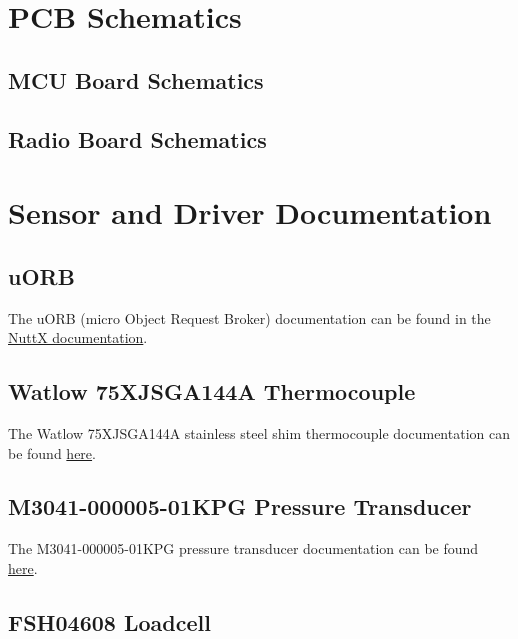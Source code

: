 \section{PCB Schematics} \label{apx:pcb-schematics}
\subsection{MCU Board Schematics}


\subsection{Radio Board Schematics}



\section{Sensor and Driver Documentation} \label{apx:sensor-docs}

\subsection{uORB}

The uORB (micro Object Request Broker) documentation can be found in the
\href{https://nuttx.apache.org/docs/latest/applications/system/uorb/index.html}{NuttX documentation}.

\subsection{Watlow 75XJSGA144A Thermocouple} \label{apx:thermocouple}

The Watlow 75XJSGA144A stainless steel shim thermocouple documentation can be found
\href{https://www.itm.com/product/watlow-75xjsga144a-stainless-steel-shim-thermocouple}{here}.

\subsection{M3041-000005-01KPG Pressure Transducer} \label{apx:pressure-transducer}

The  M3041-000005-01KPG pressure transducer documentation can be found
\href{https://www.mouser.ca/ProductDetail/Measurement-Specialties/M3041-000005-01KPG?qs=6mErgoZBfVJW4hlN091T0w%3D%3D}{here}.

\subsection{FSH04608 Loadcell} \label{apx:loadcell-button}

